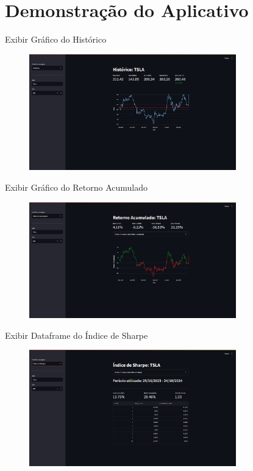 \documentclass[aspectratio=169]{beamer}
\begin{document}
\section{Demonstração do Aplicativo}
\begin{frame}{Exibir Gráfico do Histórico}
    \begin{figure}
        \centering
        \includegraphics[width=0.8\textwidth]{F1.png}
    \end{figure}
\end{frame}

\begin{frame}{Exibir Gráfico do Retorno Acumulado}
    \begin{figure}
        \centering
        \includegraphics[width=0.8\textwidth]{F2.png}
    \end{figure}
\end{frame}

\begin{frame}{Exibir Dataframe do Índice de Sharpe}
    \begin{figure}
        \centering
        \includegraphics[width=0.8\textwidth]{F3.png}
    \end{figure}
\end{frame}
\end{document}
